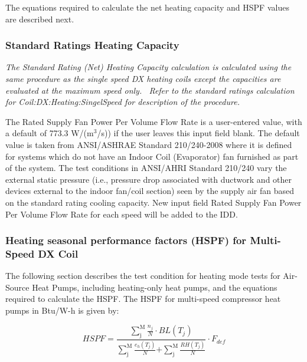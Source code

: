 The equations required to calculate the net heating capacity and HSPF values are described next.

\subsubsection{Standard Ratings Heating Capacity}\label{standard-ratings-heating-capacity}

\emph{The Standard Rating (Net) Heating Capacity calculation is calculated using the same procedure as the single speed DX heating coils except the capacities are evaluated at the maximum speed only.~ Refer to the standard ratings calculation for Coil:DX:Heating:SingelSpeed for description of the procedure.}

The Rated Supply Fan Power Per Volume Flow Rate is a user-entered value, with a default of 773.3 W/(m\(^{3}\)/s)) if the user leaves this input field blank. The default value is taken from ANSI/ASHRAE Standard 210/240-2008 where it is defined for systems which do not have an Indoor Coil (Evaporator) fan furnished as part of the system. The test conditions in ANSI/AHRI Standard 210/240 vary the external static pressure (i.e., pressure drop associated with ductwork and other devices external to the indoor fan/coil section) seen by the supply air fan based on the standard rating cooling capacity. New input field Rated Supply Fan Power Per Volume Flow Rate for each speed will be added to the IDD.

\subsubsection{Heating seasonal performance factors (HSPF) for Multi-Speed DX Coil}\label{heating-seasonal-performance-factors-hspf-for-multi-speed-dx-coil}

The following section describes the test condition for heating mode tests for Air-Source Heat Pumps, including heating-only heat pumps, and the equations required to calculate the HSPF. The HSPF for multi-speed compressor heat pumps in Btu/W-h is given by:

\begin{equation}
HSPF{\mathrm{ = }}\frac{{\sum\limits_{\mathrm{j}}^{\mathrm{M}} {\frac{{{n_j}}}{N} \cdot BL\left( {{T_j}} \right)} }}{{\sum\limits_{\mathrm{j}}^{\mathrm{M}} {\frac{{{e_h}\left( {{T_j}} \right)}}{N}{\mathrm{ + }}} \sum\limits_{\mathrm{j}}^{\mathrm{M}} {\frac{{RH\left( {{T_j}} \right)}}{N}} }} \cdot {F_{def}}
\end{equation}

